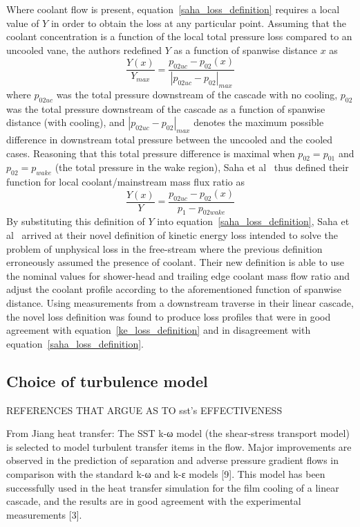 \documentclass[a4paper, 11pt, oneside]{report}
\begin{document}
Where coolant flow is present, equation~\ref{saha_loss_definition} requires a local value of $Y$ in order to obtain the loss at any particular point. Assuming that the coolant concentration is a function of the local total pressure loss compared to an uncooled vane, the authors redefined $Y$ as a function of spanwise distance $x$ as
\begin{equation}
\frac{Y\left(x\right)}{Y_{max}}
=
\frac{
	p_{02uc} - p_{02}\left(x\right)
}{
	\left| p_{02uc} - p_{02} \right|_{max}
}
\end{equation}
where $p_{02uc}$ was the total pressure downstream of the cascade with no cooling, $p_{02}$ was the total pressure downstream of the cascade as a function of spanwise distance (with cooling), and $\left| p_{02uc} - p_{02} \right|_{max}$ denotes the maximum possible difference in downstream total pressure between the uncooled and the cooled cases. Reasoning that this total pressure difference is maximal when $p_{02}=p_{01}$ and $p_{02}=p_{wake}$ (the total pressure in the wake region), Saha et al~\cite{saha_loss} thus defined their function for local coolant/mainstream mass flux ratio as
\begin{equation}
\frac{Y\left(x\right)}{Y}
=
\frac{
	p_{02uc} - p_{02}\left(x\right)
}{
	p_1 - p_{02wake}
}
\end{equation}
By substituting this definition of $Y$ into equation~\ref{saha_loss_definition}, Saha et al~\cite{saha_loss} arrived at their novel definition of kinetic energy loss intended to solve the problem of unphysical loss in the free-stream where the previous definition erroneously assumed the presence of coolant. Their new definition is able to use the nominal values for shower-head and trailing edge coolant mass flow ratio and adjust the coolant profile according to the aforementioned function of spanwise distance. Using measurements from a downstream traverse in their linear cascade, the novel loss definition was found to produce loss profiles that were in good agreement with equation~\ref{ke_loss_definition} and in disagreement with equation~\ref{saha_loss_definition}.

\subsection{Choice of turbulence model}

REFERENCES THAT ARGUE AS TO sst's EFFECTIVENESS

From Jiang heat transfer:
The SST k-ω model (the shear-stress transport model) is selected to model turbulent transfer items in the flow. Major improvements are observed in the prediction of separation and adverse pressure gradient flows in comparison with the standard k-ω and k-ε models [9]. This model has been successfully used in the heat transfer simulation for the film cooling of a linear cascade, and the results are in good agreement with the experimental measurements [3].
\end{document}
